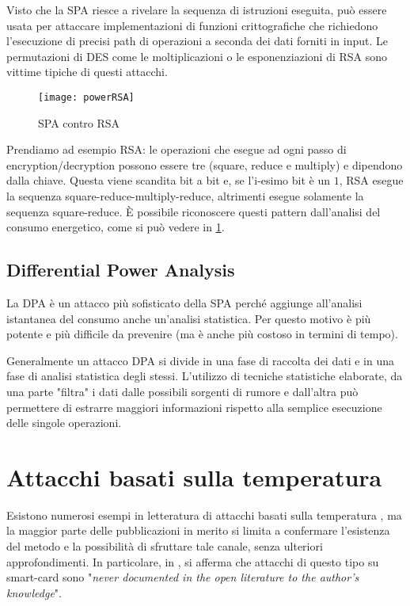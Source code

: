 		Visto che la \ac{SPA} riesce a rivelare la sequenza di istruzioni eseguita, può essere usata per attaccare implementazioni di funzioni crittografiche che richiedono l'esecuzione di precisi path di operazioni a seconda dei dati forniti in input. Le permutazioni di \ac{DES} come le moltiplicazioni o le esponenziazioni di RSA sono vittime tipiche di questi attacchi.
		
		\begin{figure}
			\begin{center}
				\texttt{[image: powerRSA]}
				\caption{SPA contro RSA}
				\label{fig:RSAPower}
			\end{center}
		\end{figure}
	
		Prendiamo ad esempio RSA: le operazioni che esegue ad ogni passo di encryption/decryption possono essere tre (square, reduce e multiply) e dipendono dalla chiave. Questa viene scandita bit a bit e, se l'i-esimo bit è un $1$, RSA esegue la sequenza square-reduce-multiply-reduce, altrimenti esegue solamente la sequenza square-reduce. \`{E} possibile riconoscere questi pattern dall'analisi del consumo energetico, come si può vedere in \cref{fig:RSAPower}. 
		
		\subsection{Differential Power Analysis}
			La \ac{DPA} è un attacco più sofisticato della \ac{SPA} perché aggiunge all'analisi istantanea del consumo anche un'analisi statistica. Per questo motivo è più potente e più difficile da prevenire (ma è anche più costoso in termini di tempo).
			
			Generalmente un attacco \ac{DPA} si divide in una fase di raccolta dei dati e in una fase di analisi statistica degli stessi. L'utilizzo di tecniche statistiche elaborate, da una parte "filtra" i dati dalle possibili sorgenti di rumore e dall'altra può permettere di estrarre maggiori informazioni rispetto alla semplice esecuzione delle singole operazioni. 
	
	\section{Attacchi basati sulla temperatura}
		Esistono numerosi esempi in letteratura di attacchi basati sulla temperatura \cite{brouchier2009temperature,brouchier2009thermocommunication,skorobogatov2002low}, ma la maggior parte delle pubblicazioni in merito si limita a confermare l'esistenza del metodo e la possibilità di sfruttare tale canale, senza ulteriori approfondimenti.
		In particolare, in \cite{bar2006sorcerer}, si afferma che attacchi di questo tipo su smart-card sono "\emph{never documented in the open literature to the author’s knowledge}".
			

